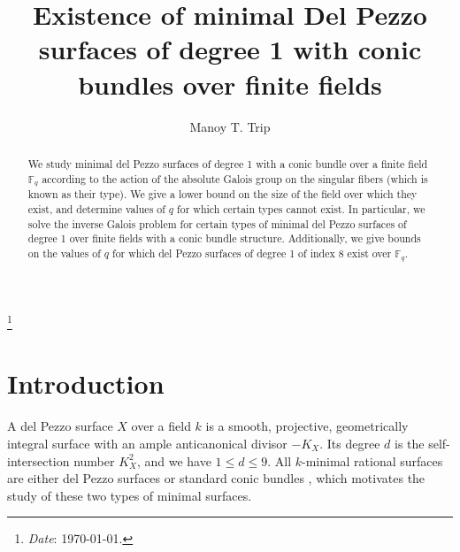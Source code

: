 \documentclass[a4paper, 11pt, reqno]{amsart}
\numberwithin{equation}{section} \numberwithin{figure}{section}
\newcommand\blfootnote[1]{%
  \begingroup
  \renewcommand\thefootnote{}\footnote{#1}%
  \addtocounter{footnote}{-1}%
  \endgroup
}
\def \F {{\mathbb F}}
\def \P {{\mathbb P}}
\theoremstyle{definition}
\numberwithin{lemma}{section}
\begin{document}
\title{Existence of minimal Del Pezzo surfaces of degree 1 with conic bundles over finite fields}


\author{Manoy T. Trip}

\begin{abstract}
    We study minimal del Pezzo surfaces of degree 1 with a conic bundle over a finite field $\mathbb{F}_q$ according to the action of the absolute Galois group on the singular fibers (which is known as their type). We give a lower bound on the size of the field over which they exist, and determine values of $q$ for which certain types cannot exist. In particular, we solve the inverse Galois problem for certain types of minimal del Pezzo surfaces of degree 1 over finite fields with a conic bundle structure. Additionally, we give bounds on the values of $q$ for which del Pezzo surfaces of degree 1 of index 8 exist over $\F_q$.
\end{abstract}

\maketitle

\blfootnote{\textit{Date}: \today.}

\thispagestyle{empty}

\section{Introduction} \label{sec:intro}

A del Pezzo surface $X$ over a field $k$ is a smooth, projective, geometrically integral surface with an ample anticanonical divisor $-K_X$. Its degree $d$ is the self-intersection number $K_X^2$, and we have $1 \leq d \leq 9$. All $k$-minimal rational surfaces are either del Pezzo surfaces or standard conic bundles \cite[Theorem 1]{iskovskih}, which motivates the study of these two types of minimal surfaces.
\end{document}
